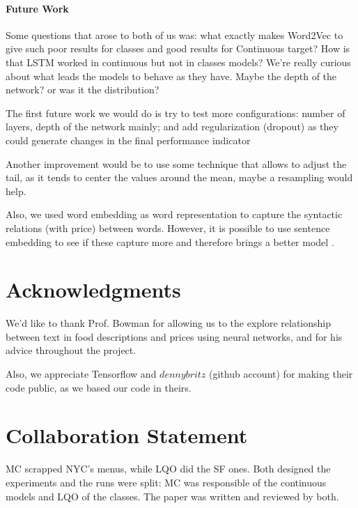 \documentclass[11pt,letterpaper]{article}
\begin{document}
\paragraph{Future Work}
Some questions that arose to both of us was: what exactly makes Word2Vec to give such poor results for classes and good results for Continuous target? How is that LSTM worked in continuous but not in classes models? We're really curious about what leads the models to behave as they have. Maybe the depth of the network? or was it the distribution?

The first future work we would do is try to test more configurations: number of layers, depth of the network mainly; and add regularization (dropout) as they could generate changes in the final performance indicator 

Another improvement would be to use some technique that allows to adjust the tail, as it tends to center the values around the mean, maybe a resampling would help.

Also, we used word embedding as word representation to capture the syntactic relations (with price) between words. However, it is possible to use sentence embedding to see if these capture more and therefore brings a better model \cite{hill2016learning}. 




\section*{Acknowledgments}
We'd like to thank Prof. Bowman for allowing us to the explore relationship between text in food descriptions and prices using neural networks, and for his advice throughout the project.

Also, we appreciate Tensorflow and $dennybritz$ (github account) for making their code public, as we based our code in theirs. 

\section*{Collaboration Statement}
MC scrapped NYC's menus, while LQO did the SF ones. Both designed the experiments and the runs were split: MC was responsible of the continuous models and LQO of the classes. The paper was written and reviewed by both. 



\end{document}
